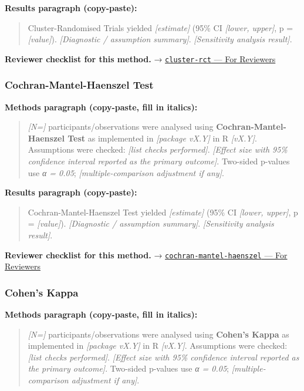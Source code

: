 \documentclass[
]{article}
\begin{document}
\textbf{Results paragraph (copy-paste):}

\begin{quote}
Cluster-Randomised Trials yielded \emph{{[}estimate{]}} (95\% CI
\emph{{[}lower, upper{]}}, p = \emph{{[}value{]}}). \emph{{[}Diagnostic
/ assumption summary{]}}. \emph{{[}Sensitivity analysis result{]}}.
\end{quote}

\textbf{Reviewer checklist for this method.} →
\href{../chapters/14-clinical/cluster-rct.Rmd\#for-reviewers}{\texttt{cluster-rct}
--- For Reviewers}

\subsubsection{Cochran-Mantel-Haenszel
Test}\label{cochran-mantel-haenszel-test}

\textbf{Methods paragraph (copy-paste, fill in italics):}

\begin{quote}
\emph{{[}N={]}} participants/observations were analysed using
\textbf{Cochran-Mantel-Haenszel Test} as implemented in \emph{{[}package
vX.Y{]}} in R \emph{{[}vX.Y{]}}. Assumptions were checked: \emph{{[}list
checks performed{]}}. \emph{{[}Effect size with 95\% confidence interval
reported as the primary outcome{]}}. Two-sided p-values use \emph{α =
0.05}; \emph{{[}multiple-comparison adjustment if any{]}}.
\end{quote}

\textbf{Results paragraph (copy-paste):}

\begin{quote}
Cochran-Mantel-Haenszel Test yielded \emph{{[}estimate{]}} (95\% CI
\emph{{[}lower, upper{]}}, p = \emph{{[}value{]}}). \emph{{[}Diagnostic
/ assumption summary{]}}. \emph{{[}Sensitivity analysis result{]}}.
\end{quote}

\textbf{Reviewer checklist for this method.} →
\href{../chapters/04-inferential/cochran-mantel-haenszel.Rmd\#for-reviewers}{\texttt{cochran-mantel-haenszel}
--- For Reviewers}

\subsubsection{Cohen's Kappa}\label{cohens-kappa}

\textbf{Methods paragraph (copy-paste, fill in italics):}

\begin{quote}
\emph{{[}N={]}} participants/observations were analysed using
\textbf{Cohen's Kappa} as implemented in \emph{{[}package vX.Y{]}} in R
\emph{{[}vX.Y{]}}. Assumptions were checked: \emph{{[}list checks
performed{]}}. \emph{{[}Effect size with 95\% confidence interval
reported as the primary outcome{]}}. Two-sided p-values use \emph{α =
0.05}; \emph{{[}multiple-comparison adjustment if any{]}}.
\end{quote}
\end{document}
